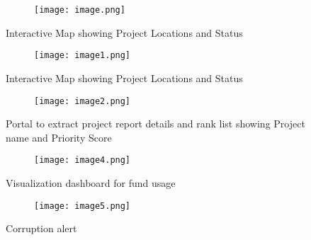 \documentclass[12pt,a4paper]{report}
\begin{document}
\begin{figure}[H]
    \centering
\begin{figure}
        \centering
        \texttt{[image: image.png]}
        \label{fig:enter-label}
    \end{figure}
        \caption{Interactive Map showing Project Locations and Status}
    \label{fig:dashboard}
\end{figure}

\begin{figure}[H]
    \centering
    \begin{figure}
        \centering
        \texttt{[image: image1.png]}
        \label{fig:enter-label}
    \end{figure}
    \caption{Interactive Map showing Project Locations and Status}
    \label{fig:submission_form}
\end{figure}

\begin{figure}[H]
    \centering
    \begin{figure}
        \centering
        \texttt{[image: image2.png]}
        \label{fig:enter-label}
    \end{figure}
    \caption{Portal to extract project report details and rank list showing Project name and Priority Score}
    \label{fig:map_interface}
\end{figure}

\begin{figure}[H]
    \centering
    \begin{figure}
        \centering
        \texttt{[image: image4.png]}
        \label{fig:enter-label}
    \end{figure}
    \caption{Visualization dashboard for fund usage}
    \label{fig:map_interface}
\end{figure}

\begin{figure}[H]
    \centering
    \begin{figure}
        \centering
        \texttt{[image: image5.png]}
        \label{fig:enter-label}
    \end{figure}
    \caption{Corruption alert}
    \label{fig:map_interface}
\end{figure}
\end{document}
